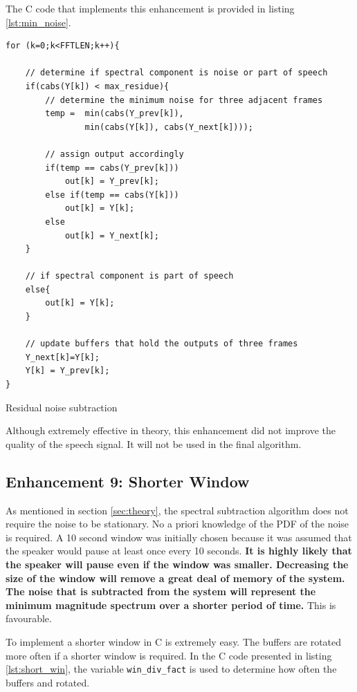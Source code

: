 \documentclass[a4paper,pra,twocolumn,10pt,aps,longbibliography,nobalancelastpage]{revtex4-1}
\begin{document}
The C code that implements this enhancement is provided in listing \ref{lst:min_noise}.
\begin{listing}[H]
\begin{verbatim}
for (k=0;k<FFTLEN;k++){ 

    // determine if spectral component is noise or part of speech
    if(cabs(Y[k]) < max_residue){
        // determine the minimum noise for three adjacent frames
        temp =  min(cabs(Y_prev[k]), 
                min(cabs(Y[k]), cabs(Y_next[k])));
    
        // assign output accordingly
        if(temp == cabs(Y_prev[k]))
            out[k] = Y_prev[k];
        else if(temp == cabs(Y[k]))
            out[k] = Y[k];
        else
            out[k] = Y_next[k];
    }
    
    // if spectral component is part of speech
    else{
        out[k] = Y[k];
    }
    
    // update buffers that hold the outputs of three frames
    Y_next[k]=Y[k];
    Y[k] = Y_prev[k];
}
\end{verbatim}
\caption{Residual noise subtraction} 
\label{lst:min_noise}
\end{listing}

Although extremely effective in theory, this enhancement did not improve the quality of the speech signal. It will not be used in the final algorithm.

\subsection{Enhancement 9: Shorter Window}
As mentioned in section \ref{sec:theory}, the spectral subtraction algorithm does not require the noise to be stationary. No a priori knowledge of the PDF of the noise is required. A 10 second window was initially chosen because it was assumed that the speaker would pause at least once every 10 seconds. \textbf{It is highly likely that the speaker will pause even if the window was smaller. Decreasing the size of the window will remove a great deal of memory of the system. The noise that is subtracted from the system will represent the minimum magnitude spectrum over a shorter period of time.} This is favourable. 

To implement a shorter window in C is extremely easy. The buffers are rotated more often if a shorter window is required. In the C code presented in listing \ref{lst:short_win}, the variable {\tt win\_div\_fact} is used to determine how often the buffers and rotated.
\end{document}
